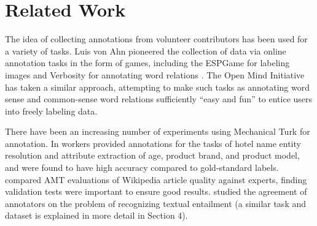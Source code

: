 \documentclass[11pt]{article}
\begin{document}


\section{Related Work}

The idea of collecting annotations from volunteer contributors has been used for a variety
of tasks. Luis von Ahn pioneered the collection of data via online
annotation tasks in the form of games, including the ESPGame for
labeling images \cite{espgame} and Verbosity for annotating word
relations \cite{verbosity}.  The Open Mind Initiative \cite{OpenMind}
has taken a similar approach, attempting to make such tasks as
annotating word sense \cite{WordExpert} and common-sense word
relations \cite{OpenMindCommonSense} sufficiently ``easy and fun''
to entice users into freely labeling data.

There have been an increasing number of experiments using Mechanical
Turk for annotation.  In \cite{Su:07} workers provided annotations for the tasks of
hotel name entity resolution and attribute extraction of age, product brand, and
product model, and were found to have high accuracy compared to gold-standard labels.  
 compared AMT evaluations of Wikipedia article quality against experts, finding validation tests were important to ensure good results.
 studied the agreement of annotators
on the problem of recognizing textual entailment (a similar task
and dataset is explained in more detail in Section 4).
\end{document}
